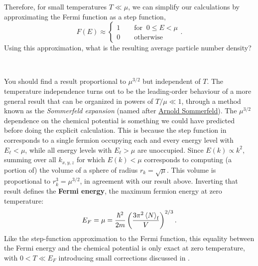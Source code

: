 Therefore, for small temperatures $T \ll \mu$, we can simplify our calculations by approximating the Fermi function as a step function,
\begin{equation}
  \label{eq:Fermi_step}
  F(E) \approx \left\{\begin{array}{l}1 \qquad \mbox{for } \ 0 \leq E < \mu \\
                                      0 \qquad \mbox{otherwise}\end{array}\right. .
\end{equation}
Using this approximation, what is the resulting average particle number density?
\begin{mdframed}
  \ \\[100 pt]
\end{mdframed}

You should find a result proportional to $\mu^{3 / 2}$ but independent of $T$.
The temperature independence turns out to be the leading-order behaviour of a more general result that can be organized in powers of $T / \mu \ll 1$, through a method known as the \textit{Sommerfeld expansion} (named after \href{https://en.wikipedia.org/wiki/Arnold_Sommerfeld}{Arnold Sommerfeld}).
The $\mu^{3 / 2}$ dependence on the chemical potential is something we could have predicted before doing the explicit calculation.
This is because the step function in  corresponds to a single fermion occupying each and every energy level with $E_{\ell} < \mu$, while all energy levels with $E_{\ell} > \mu$ are unoccupied.
Since $E(k) \propto k^2$, summing over all $k_{x, y, z}$ for which $E(k) < \mu$ corresponds to computing (a portion of) the volume of a sphere of radius $r_k = \sqrt{\mu}$.
This volume is proportional to $r_k^3 = \mu^{3 / 2}$, in agreement with our result above.
Inverting that result defines the \textbf{Fermi energy}, the maximum fermion energy at zero temperature:
\begin{equation}
  \label{eq:Fermi_energy}
  E_F = \mu = \frac{\hbar^2}{2m}\left(\frac{3\pi^2 \left\langle N \right\rangle_{\text{f}}}{V}\right)^{2 / 3}.
\end{equation}
Like the step-function approximation to the Fermi function, this equality between the Fermi energy and the chemical potential is only exact at zero temperature, with $0 < T \ll E_F$ introducing small corrections discussed in . %

